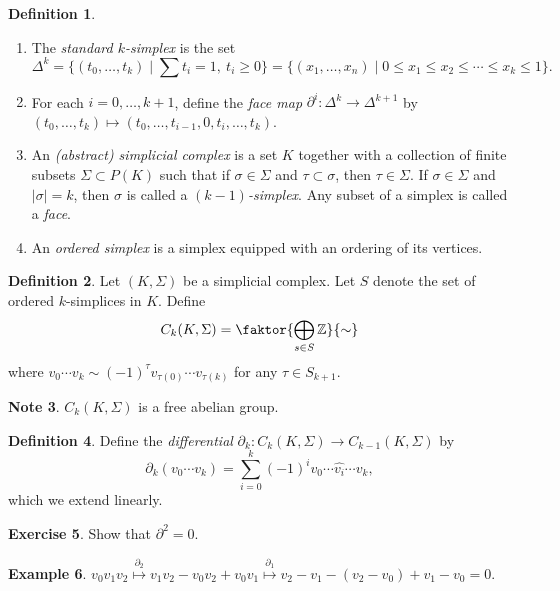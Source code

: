 \documentclass[10pt,letterpaper,cm]{nupset}
\theoremstyle{definition}
\newtheorem{definition}{Definition}[subsection]
\newtheorem{exmp}[definition]{Example}
\newtheorem{note}[definition]{Note}
\theoremstyle{theorem}
\newtheorem{exercise}[definition]{Exercise}
\theoremstyle{remark}
\newcommand{\Z}{\mathbb Z}
\newcommand{\1}{\mathbb{1}}
\newcommand{\0}{\vec 0}
\begin{document}
\begin{definition} $ $
\begin{enumerate}
\item The \textit{standard $k$-simplex} is the set $$  \Delta^k = \{(t_0, \ldots, t_k) \mid \sum t_i = 1, \ t_i \geq 0 \} = \{(x_1, \ldots, x_n) \mid 0\leq x_1 \leq x_2 \leq \cdots \leq x_k \leq 1 \} .$$
\item For each $i=0, \ldots, k+1$, define the \textit{face map} $\partial^i : \Delta^k \to \Delta^{k+1}$ by $(t_0, \ldots, t_k) \mapsto (t_0, \ldots, t_{i-1}, 0, t_i, \ldots, t_k)$.
\item An \textit{(abstract) simplicial complex} is a set $K$ together with a collection of finite subsets $\Sigma \subset P(K)$ such that if $\sigma \in \Sigma$ and $\tau \subset \sigma$, then $\tau \in \Sigma$. If $\sigma \in \Sigma$ and $|\sigma |= k$, then $\sigma$ is called a \textit{$(k-1)$-simplex}. Any subset of a simplex is called a \textit{face}.
\item An \textit{ordered simplex} is a simplex equipped with an ordering of its vertices. 
\end{enumerate}
\end{definition}

\begin{definition}
Let $(K, \Sigma)$ be a simplicial complex. Let $S$ denote the set of ordered $k$-simplices in $K$. Define $$C_k(K, \Sigma) =\faktor{\bigoplus_{s\in S} \Z}{\sim}$$ where  $v_0\cdots v_k \sim (-1)^{\tau} v_{\tau(0)}\cdots v_{\tau(k)}$ for any $\tau \in S_{k+1}$.
\end{definition}

\begin{note}
$C_k(K, \Sigma)$ is a free abelian group.
\end{note}

\begin{definition}
Define the \textit{differential} $\partial_{k} : C_k(K, \Sigma) \to C_{k-1}(K, \Sigma)$ by  $$\partial_{k}(v_0\cdots v_k) = \sum_{i=0}^k (-1)^i v_0 \cdots \widehat{v_i} \cdots v_k, $$ which we extend linearly.  
\end{definition}

\begin{exercise}
Show that $\partial^2 =0$.
\end{exercise}

\begin{exmp}
$v_0v_1v_2 \overset{\partial_2}{\mapsto}  v_1 v_2 - v_0v_2 + v_0v_1  \overset{\partial_1}{\mapsto} v_2 - v_1 -(v_2 - v_0) + v_1 - v_0 =0 .$
\end{exmp}
\end{document}
